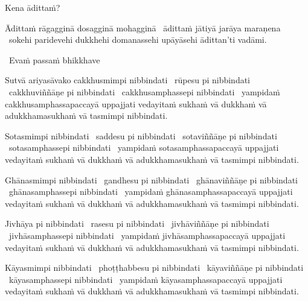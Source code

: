 Kena ādittaṁ?

\begin{pali-hang}
  Ādittaṁ rāgagginā dosagginā mohagginā \breathmark\ ādittaṁ jātiyā jarāya maraṇena \breathmark\ sokehi paridevehi dukkhehi domanassehi upāyāsehi ādittan'ti vadāmi.
\end{pali-hang}

\begin{leader-only}
  \anglebracketleft\ \hspace{-0.5mm}Evaṁ passaṁ bhikkhave \hspace{-0.5mm}\anglebracketright\
\end{leader-only}

\vspace{-0.99em} %

\begin{pali-hang}
  Sutvā ariyasāvako cakkhusmimpi nibbindati \breathmark\ rūpesu pi nibbindati \breathmark\ cakkhuviññāṇe pi nibbindati \breathmark\ cakkhusamphassepi nibbindati \breathmark\ yampidaṁ cakkhusamphassapaccayā uppajjati vedayitaṁ sukhaṁ vā dukkhaṁ vā adukkhamasukhaṁ vā tasmimpi nibbindati.
\end{pali-hang}

\begin{pali-hang}
  Sotasmimpi nibbindati \breathmark\ saddesu pi nibbindati \breathmark\ sotaviññāṇe pi nibbindati \breathmark\ sotasamphassepi nibbindati \breathmark\ yampidaṁ sotasamphassapaccayā uppajjati vedayitaṁ sukhaṁ vā dukkhaṁ vā adukkhamasukhaṁ vā tasmimpi nibbindati.
\end{pali-hang}

\begin{pali-hang}
  Ghānasmimpi nibbindati \breathmark\ gandhesu pi nibbindati \breathmark\ ghānaviññāṇe pi nibbindati \breathmark\ ghānasamphassepi nibbindati \breathmark\ yampidaṁ ghānasamphassapaccayā uppajjati vedayitaṁ sukhaṁ vā dukkhaṁ vā adukkhamasukhaṁ vā tasmimpi nibbindati.
\end{pali-hang}

\begin{pali-hang}
  Jivhāya pi nibbindati \breathmark\ rasesu pi nibbindati \breathmark\ jivhāviññāṇe pi nibbindati \breathmark\ jivhāsamphassepi nibbindati \breathmark\ yampidaṁ jivhāsamphassapaccayā uppajjati vedayitaṁ sukhaṁ vā dukkhaṁ vā adukkhamasukhaṁ vā tasmimpi nibbindati.
\end{pali-hang}

\begin{pali-hang}
  Kāyasmimpi nibbindati \breathmark\ phoṭṭhabbesu pi nibbindati \breathmark\ kāyaviññāṇe pi nibbindati \breathmark\ kāyasamphassepi nibbindati \breathmark\ yampidaṁ kāyasamphassapaccayā uppajjati vedayitaṁ sukhaṁ vā dukkhaṁ vā adukkhamasukhaṁ vā tasmimpi nibbindati.
\end{pali-hang}

